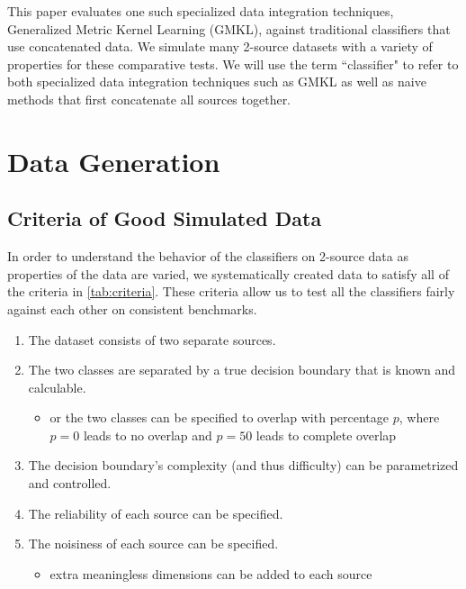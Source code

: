 \documentclass{article}
\begin{document}
This paper evaluates one such specialized data integration techniques,
Generalized Metric Kernel Learning (GMKL), against traditional classifiers that
use concatenated data. We simulate many 2-source datasets with a variety of
properties for these comparative tests. We will use the term ``classifier" to
refer to both specialized data integration techniques such as GMKL as well as
naive methods that first concatenate all sources together.













\section*{Data Generation}



\subsection*{Criteria of Good Simulated Data}

In order to understand the behavior of the classifiers on 2-source data as
properties of the data are varied, we systematically created data to satisfy
all of the criteria in \ref{tab:criteria}. These criteria allow us to test all
the classifiers fairly against each other on consistent benchmarks.

\begin{minipage}{\textwidth}
\centering
\begin{enumerate}
    \item The dataset consists of two separate sources.
    \item \label{itm:separable} The two classes are separated by a true
        decision boundary that is known and calculable.
    \begin{itemize}
        \item or the two classes can be specified to overlap with percentage
            $p$, where $p=0$ leads to no overlap and $p=50$ leads to complete
            overlap
    \end{itemize}
    \item The decision boundary's complexity (and thus difficulty) can be
        parametrized and controlled.
    \item The reliability of each source can be specified.
    \item The noisiness of each source can be specified.
    \begin{itemize}
        \item \label{itm:noise_dims} extra meaningless dimensions can be
            added to each source
    \end{itemize}
\end{enumerate}
\label{tab:criteria}
\end{minipage}
\end{document}
